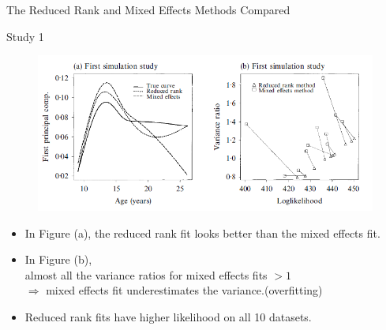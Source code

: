\documentclass{beamer}
\begin{document}
\begin{frame}{The Reduced Rank and Mixed Effects Methods Compared}
	\begin{block}{Study 1}
		\begin{figure}[h] %
			\begin{center}
				\includegraphics[width=0.7\linewidth]{img/5.png}
			\end{center}
			\label{fig:long}
			\label{fig:onecol}
		\end{figure}
		\begin{itemize}
			\item {
				In Figure (a), the reduced rank fit looks better than the mixed effects fit.
			}
			\item {
				In Figure (b),\\
				almost all the variance ratios for mixed effects fits $> 1$\\
				$\Rightarrow$ mixed effects fit underestimates the variance.(overfitting)
			}
			\item {
				Reduced rank fits have higher likelihood on all 10 datasets.
			}
		\end{itemize}
	\end{block}
\end{frame}
\end{document}
